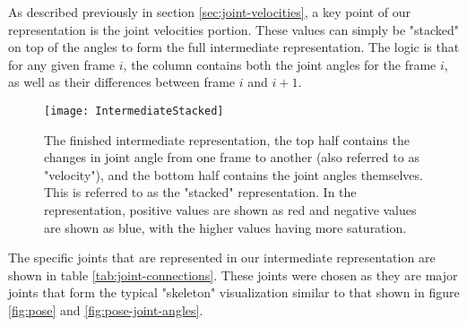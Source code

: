 As described previously in section \ref{sec:joint-velocities}, a key point of our representation is the joint velocities portion. These values can simply be "stacked" on top of the angles to form the full intermediate representation. The logic is that for any given frame $i$, the column contains both the joint angles for the frame $i$, as well as their differences between frame $i$ and $i+1$.

\begin{figure}[ht]
	\texttt{[image: IntermediateStacked]}
	\centering
	\caption{The finished intermediate representation, the top half contains the changes in joint angle from one frame to another (also referred to as "velocity"), and the bottom half contains the joint angles themselves. This is referred to as the "stacked" representation. In the representation, positive values are shown as red and negative values are shown as blue, with the higher values having more saturation.}
	\label{fig:intermediate-stacked}
\end{figure}

The specific joints that are represented in our intermediate representation are shown in table \ref{tab:joint-connections}. These joints were chosen as they are major joints that form the typical "skeleton" visualization similar to that shown in figure \ref{fig:pose} and \ref{fig:pose-joint-angles}.

